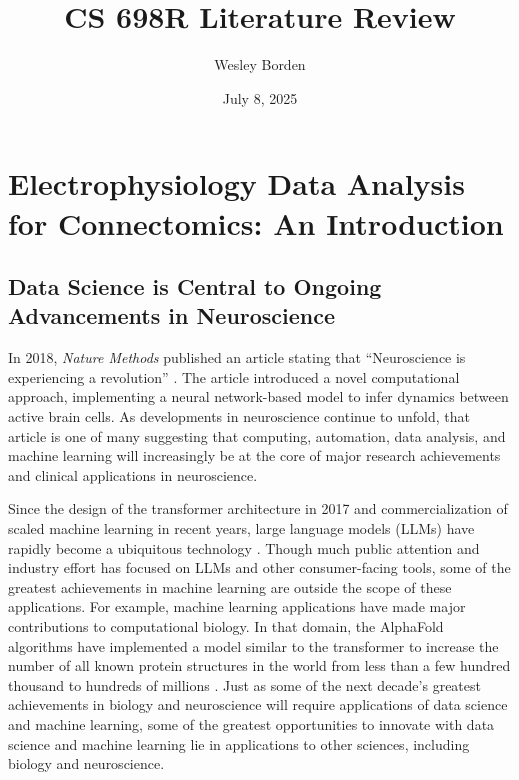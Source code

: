 \documentclass[11pt]{article}
\title{CS 698R Literature Review}
\author{Wesley Borden}
\date{July 8, 2025}
\newcommand{\sectionwithindent}[1]{
    \section*{#1}
    \hspace{\parindent} %
}
\newcommand{\subsectionwithindent}[1]{
    \subsection*{#1}
    \hspace{\parindent} %
}
\begin{document}
\sectionwithindent{Electrophysiology Data Analysis for Connectomics: An Introduction}

\vspace{-2em}

\subsectionwithindent{Data Science is Central to Ongoing Advancements in Neuroscience}
In 2018, \textit{Nature Methods} published an article stating that ``Neuroscience is experiencing a revolution'' \cite{pandarinath2018autoencoders}. The article introduced a novel computational approach, implementing a neural network-based model to infer dynamics between active brain cells. As developments in neuroscience continue to unfold, that article is one of many suggesting that computing, automation, data analysis, and machine learning will increasingly be at the core of major research achievements and clinical applications in neuroscience.

Since the design of the transformer architecture in 2017 \cite{vaswani2023attentionneed} and commercialization of scaled machine learning in recent years, large language models (LLMs) have rapidly become a ubiquitous technology \cite{naveed2025llm}. Though much public attention and industry effort has focused on LLMs and other consumer-facing tools, some of the greatest achievements in machine learning are outside the scope of these applications. For example, machine learning applications have made major contributions to computational biology. In that domain, the AlphaFold algorithms have implemented a model similar to the transformer to increase the number of all known protein structures in the world from less than a few hundred thousand to hundreds of millions \cite{jumper2021alphafold, varadi2024alphafolddb}. Just as some of the next decade's greatest achievements in biology and neuroscience will require applications of data science and machine learning, some of the greatest opportunities to innovate with data science and machine learning lie in applications to other sciences, including biology and neuroscience.
\end{document}
